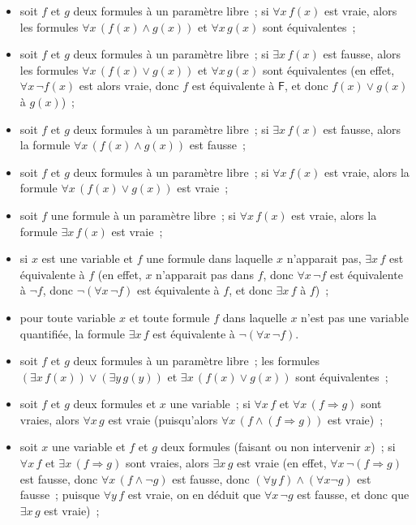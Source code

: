 \begin{itemize}
{\begin{itemize}[nosep]
            \end{itemize}
        } ; 
    \item soit $f$ et $g$ deux formules à un paramètre libre ; si $\forall x \, f(x)$ est vraie, alors les formules $\forall x \, (f(x) \wedge g(x))$ et $\forall x \, g(x)$ sont équivalentes ; 
    \item soit $f$ et $g$ deux formules à un paramètre libre ; si $\exists x \, f(x)$ est fausse, alors les formules $\forall x \, (f(x) \vee g(x))$ et $\forall x \, g(x)$ sont équivalentes (en effet, $\forall x \, \neg f(x)$ est alors vraie, donc $f$ est équivalente à $\mathsf{F}$, et donc $f(x) \vee g(x)$ à $g(x)$) ; 
    \item soit $f$ et $g$ deux formules à un paramètre libre ; si $\exists x \, f(x)$ est fausse, alors la formule $\forall x \, (f(x) \wedge g(x))$ est fausse ; 
    \item soit $f$ et $g$ deux formules à un paramètre libre ; si $\forall x \, f(x)$ est vraie, alors la formule $\forall x \, (f(x) \vee g(x))$ est vraie ; 
    \item soit $f$ une formule à un paramètre libre ; si $\forall x \, f(x)$ est vraie, alors la formule $\exists x \, f(x)$ est vraie ; 
    \item si $x$ est une variable et $f$ une formule dans laquelle $x$ n'apparait pas, $\exists x \, f$ est équivalente à $f$ (en effet, $x$ n'apparait pas dans $f$, donc $\forall x \, \neg f$ est équivalente à $\neg f$, donc $\neg (\forall x \, \neg f)$ est équivalente à $f$, et donc $\exists x \, f$ à $f$) ; 
    \item pour toute variable $x$ et toute formule $f$ dans laquelle $x$ n'est pas une variable quantifiée, la formule $\exists x \, f$ est équivalente à $\neg (\forall x \, \neg f)$.
    \item soit $f$ et $g$ deux formules à un paramètre libre ; les formules $(\exists x \, f(x)) \vee (\exists y \, g(y))$ et $\exists x \, (f(x) \vee g(x))$ sont équivalentes ;
    \item soit $f$ et $g$ deux formules et $x$ une variable ; si $\forall x \, f$ et $\forall x \, (f \Rightarrow g)$ sont vraies, alors $\forall x \, g$ est vraie (puisqu'alors $\forall x \, (f \wedge (f \Rightarrow g))$ est vraie) ; 
    \item soit $x$ une variable et $f$ et $g$ deux formules (faisant ou non intervenir $x$) ; si $\forall x \, f$ et $\exists x \, (f \Rightarrow g)$ sont vraies, alors $\exists x \, g$ est vraie (en effet, $\forall x \, \neg (f \Rightarrow g)$ est fausse, donc $\forall x \, (f \wedge \neg g)$ est fausse, donc $(\forall y \, f) \wedge (\forall x \neg g)$ est fausse ; puisque $\forall y \, f$ est vraie, on en déduit que $\forall x \, \neg g$ est fausse, et donc que $\exists x \, g$ est vraie) ; 

\end{itemize}
